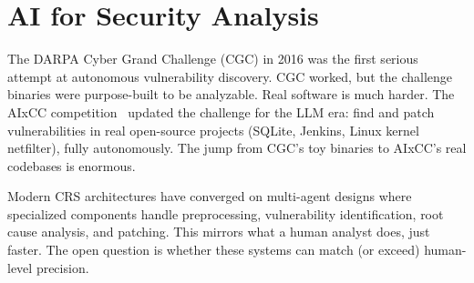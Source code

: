 \section{AI for Security Analysis}

The DARPA Cyber Grand Challenge (CGC) in 2016 was the first serious attempt at autonomous vulnerability discovery. CGC worked, but the challenge binaries were purpose-built to be analyzable. Real software is much harder. The AIxCC competition~\cite{darpa2025aixcc} updated the challenge for the LLM era: find and patch vulnerabilities in real open-source projects (SQLite, Jenkins, Linux kernel netfilter), fully autonomously. The jump from CGC's toy binaries to AIxCC's real codebases is enormous.

Modern CRS architectures have converged on multi-agent designs where specialized components handle preprocessing, vulnerability identification, root cause analysis, and patching. This mirrors what a human analyst does, just faster. The open question is whether these systems can match (or exceed) human-level precision.
